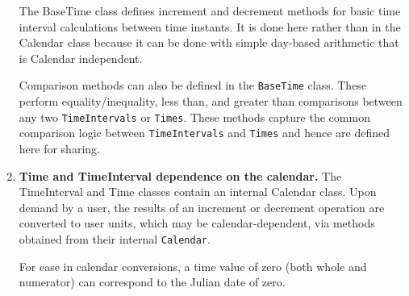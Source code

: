 \begin{enumerate}
The BaseTime class defines increment and decrement methods for basic
time interval calculations between time instants.  It is done here rather
than in the Calendar class because it can be done with simple 
day-based arithmetic that is Calendar independent.  

Comparison methods can also be defined in the {\tt BaseTime} class.  These
perform equality/inequality, less than, and greater than comparisons
between any two {\tt TimeIntervals} or {\tt Times}.  These methods capture
the common comparison logic between {\tt TimeIntervals} and {\tt Times} and
hence are defined here for sharing.

\item {\bf Time and TimeInterval dependence on the calendar.} The TimeInterval 
and Time classes contain an internal Calendar class.  
Upon demand by a user, the results of an increment or decrement operation are 
converted to user units, which may be calendar-dependent, via methods 
obtained from their internal {\tt Calendar}.

For ease in calendar conversions, a time value of zero (both whole and
numerator) can correspond to the Julian date of zero. 
\end{enumerate}












